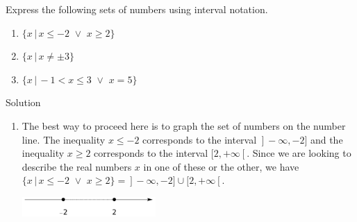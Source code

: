 \ifcalculus
\begin{example} \label{unionex} 
	Express the following sets of numbers using interval notation.
	
	\begin{multicols}{2}
		
		\begin{enumerate}
			
			\item  $\{ x \, | \, x \leq -2 \, \, \vee \, \,  x \geq 2 \}$
			
			
			
			
			
			
			
			
			
			\item  $\{ x \, | \, x \neq \pm 3 \}$
			
			\item  $\{ x \, | \, -1 < x \leq 3 \,\, \vee \,\, x = 5\}$
			
		\end{enumerate}
		
	\end{multicols}
	
	Solution 
	
	\begin{enumerate}
		
		\item  The best way to proceed here is to graph the set of numbers on the number line.  The inequality $x \leq -2$ corresponds to the interval $\left.\right]-\infty, -2]$ and the inequality $x \geq 2$ corresponds to the interval $[2, +\infty\left[\right.$.  Since we are looking to describe the real numbers $x$ in one of these or the other, we have $\{ x \, | \, x \leq -2 \, \, \vee \, \,  x \geq 2 \} = \left.\right]-\infty, -2] \cup [2, +\infty\left[\right.$.
		
		\begin{center}
			\includegraphics[width=0.4\textwidth]{fig_sets_10a}
		\end{center}
		

\end{enumerate}
\end{example}
